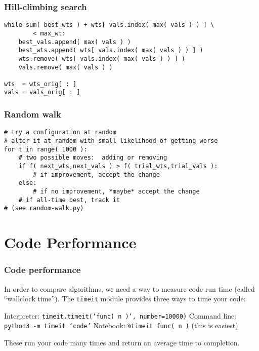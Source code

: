 \documentclass[11pt]{beamer}
\begin{document}
\begin{frame}[fragile]
  \frametitle{Hill-climbing search}

  \begin{Verbatim}
while sum( best_wts ) + wts[ vals.index( max( vals ) ) ] \
        < max_wt:
    best_vals.append( max( vals ) )
    best_wts.append( wts[ vals.index( max( vals ) ) ] )
    wts.remove( wts[ vals.index( max( vals ) ) ] )
    vals.remove( max( vals ) )

wts  = wts_orig[ : ]
vals = vals_orig[ : ]
  \end{Verbatim}
\end{frame}

\begin{frame}[fragile]
  \frametitle{Random walk}

  \begin{Verbatim}
# try a configuration at random
# alter it at random with small likelihood of getting worse
for t in range( 1000 ):
    # two possible moves:  adding or removing
    if f( next_wts,next_vals ) > f( trial_wts,trial_vals ):
        # if improvement, accept the change
    else:
        # if no improvement, *maybe* accept the change
    # if all-time best, track it
# (see random-walk.py)
  \end{Verbatim}
\end{frame}

\section{Code Performance}

\begin{frame}[fragile]
  \frametitle{Code performance}
  \Enlarge

  \begin{enumerate}
  \myitem  In order to compare algorithms, we need a way to measure code run time (called ``wallclock time''). \pause
  \myitem  The \texttt{timeit} module provides three ways to time your code: \pause
    \begin{enumerate}
    \mysubitem  Interpreter:  \texttt{timeit.timeit('func( n )', number=10000)} \pause
    \mysubitem  Command line:  \texttt{python3 -m timeit 'code'} \pause
    \mysubitem  Notebook:  \texttt{\%timeit func( n )}  (this is easiest) \pause
    \end{enumerate}
  \myitem  These run your code many times and return an average time to completion.
  \end{enumerate}
\end{frame}
\end{document}
